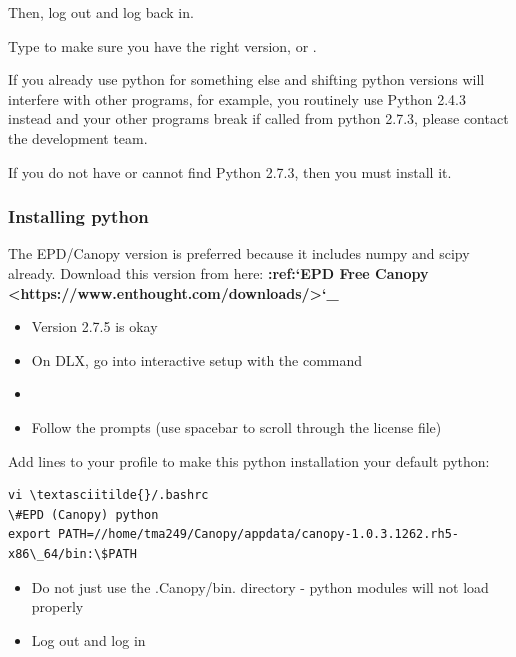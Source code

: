 \documentclass[letterpaper,10pt,english]{sphinxmanual}
\begin{document}
Then, log out and log back in.

Type  to make sure you have the right version, or .

If you already use python for something else and shifting python versions will interfere with other programs, for example, you routinely use Python 2.4.3 instead and your other programs break if called from python 2.7.3, please contact the development team.

If you do not have or cannot find Python 2.7.3, then you must install it.


\subsubsection{Installing python}
\label{1_0_installation:installing-python}
The EPD/Canopy version is preferred because it includes numpy and scipy already. Download this version from here: {\color{red}\bfseries{}:ref:{}`EPD Free Canopy \textless{}https://www.enthought.com/downloads/\textgreater{}{}`\_}
\begin{itemize}
\item {} 
Version 2.7.5 is okay

\item {} 
On DLX, go into interactive setup with the command 

\item {} 

\item {} 
Follow the prompts (use spacebar to scroll through the license file)

\end{itemize}

Add lines to your profile to make this python installation your default python:

\begin{Verbatim}[commandchars=\\\{\}]
vi \textasciitilde{}/.bashrc
\#EPD (Canopy) python
export PATH=//home/tma249/Canopy/appdata/canopy-1.0.3.1262.rh5-x86\_64/bin:\$PATH
\end{Verbatim}
\begin{itemize}
\item {} 
Do not just use the .Canopy/bin. directory - python modules will not load properly

\item {} 
Log out and log in

\end{itemize}
\end{document}
